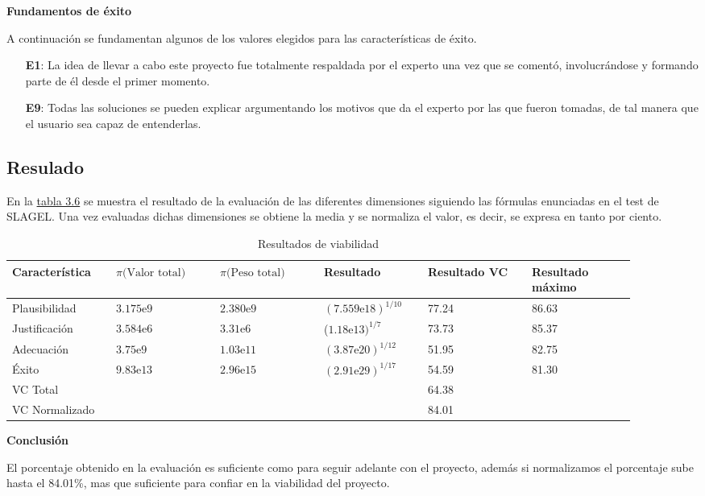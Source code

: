 \textbf{Fundamentos de éxito}

A continuación se fundamentan algunos de los valores elegidos para las características de éxito.

\begin{enumerate}
  \item[\textbf{E1}:] La idea de llevar a cabo este proyecto fue totalmente respaldada
     por el experto una vez que se comentó, involucrándose y formando parte de él desde
     el primer momento.
  \item[\textbf{E9}:] Todas las soluciones se pueden explicar argumentando los motivos
     que da el experto por las que fueron tomadas, de tal manera que el usuario sea
     capaz de entenderlas.
\end{enumerate}

\subsection{Resulado}

En la \hyperref[tab:resultados viabilidad]{tabla 3.6} se muestra el resultado de la evaluación de las diferentes dimensiones
 siguiendo las fórmulas enunciadas en el test de SLAGEL. Una vez evaluadas dichas dimensiones
 se obtiene la media y se normaliza el valor, es decir, se expresa en tanto por ciento.

\newpage

\begin{longtable}[htb]{ | p{0.15\linewidth} | p{0.15\linewidth} | p{0.15\linewidth} | p{0.15\linewidth} | p{0.15\linewidth} | p{0.15\linewidth} | }%
  \caption{Resultados de viabilidad}
  \label{tab:resultados viabilidad}

  \endfirsthead
  \endhead

  \hline
  Característica & $\pi\text{(Valor total)}$ & $\pi\text{(Peso total)}$ & Resultado & Resultado VC & Resultado máximo \\ \hline \hline
  Plausibilidad & $3.175\text{e}9$ & $2.380\text{e}9$ & $(7.559\text{e}18)^{1/10}$ & 77.24 & 86.63 \\ \hline
  Justificación & $3.584\text{e}6$  & $3.31\text{e}6$ & ($1.18\text{e}13)^{1/7}$ & 73.73 & 85.37 \\ \hline
  Adecuación & $3.75\text{e}9$ & $1.03\text{e}11$ & $(3.87\text{e}20)^{1/12}$ & 51.95 & 82.75 \\ \hline
  Éxito & $9.83\text{e}13$ & $2.96\text{e}15$ & $(2.91\text{e}29)^{1/17}$ & 54.59 & 81.30 \\ \hline \hline
  \multicolumn{4}{|l|}{VC Total} & \multicolumn{2}{l|}{64.38} \\ \hline
  \multicolumn{4}{|l|}{VC Normalizado} & \multicolumn{2}{l|}{84.01} \\ \hline

\end{longtable}

\textbf{Conclusión}

El porcentaje obtenido en la evaluación es suficiente como para seguir adelante
 con el proyecto, además si normalizamos el porcentaje sube hasta el 84.01\%,
 mas que suficiente para confiar en la viabilidad del proyecto.

